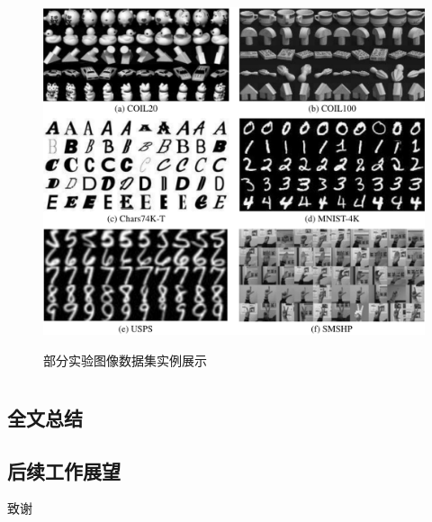 \documentclass[doctor]{thesis}
\begin{document}
\begin{figure}[!t]
    \centering
    \includegraphics[width=16.5cm]{./figs/fig_data_visualization.pdf}\\
    \caption{部分实验图像数据集实例展示}
    \label{chapter_sgae_data_visualization}
\end{figure}








\thesisChapterConclusion
\chapter{}

\section{全文总结}



\section{后续工作展望}




\begin{thesisAcknowledgement}
 致谢
\end{thesisAcknowledgement}
\end{document}
